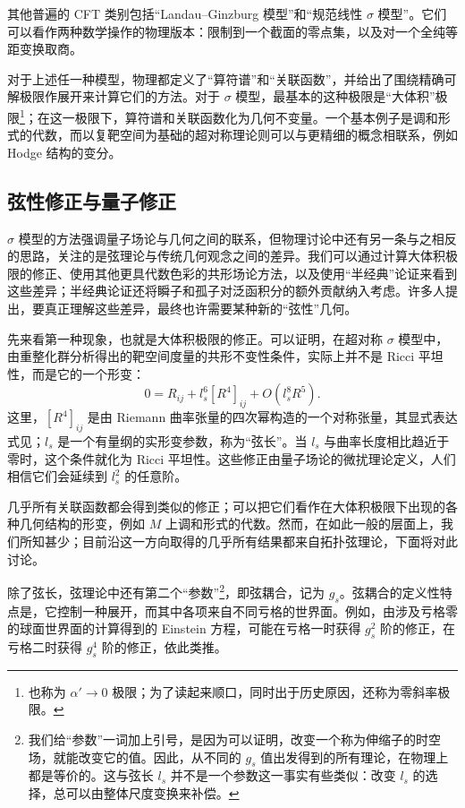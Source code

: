 其他普遍的 CFT 类别包括“Landau--Ginzburg 模型”和“规范线性 $\sigma$ 模型”。它们可以看作两种数学操作的物理版本：限制到一个截面的零点集，以及对一个全纯等距变换取商。

对于上述任一种模型，物理都定义了“算符谱”和“关联函数”，并给出了围绕精确可解极限作展开来计算它们的方法。对于 $\sigma$ 模型，最基本的这种极限是“大体积”极限\footnote{也称为 $\alpha'\to0$ 极限；为了读起来顺口，同时出于历史原因，还称为零斜率极限。}；在这一极限下，算符谱和关联函数化为几何不变量。一个基本例子是调和形式的代数，而以复靶空间为基础的超对称理论则可以与更精细的概念相联系，例如 Hodge 结构的变分。

\subsection{弦性修正与量子修正}\label{sec:1.1.1}

$\sigma$ 模型的方法强调量子场论与几何之间的联系，但物理讨论中还有另一条与之相反的思路，关注的是弦理论与传统几何观念之间的差异。我们可以通过计算大体积极限的修正、使用其他更具代数色彩的共形场论方法，以及使用“半经典”论证来看到这些差异；半经典论证还将瞬子和孤子对泛函积分的额外贡献纳入考虑。许多人提出，要真正理解这些差异，最终也许需要某种新的“弦性”几何。

先来看第一种现象，也就是大体积极限的修正。可以证明，在超对称 $\sigma$ 模型中，由重整化群分析得出的靶空间度量的共形不变性条件，实际上并不是 Ricci 平坦性，而是它的一个形变：
\begin{equation}\label{eq:1.1}
0=R_{ij}+l_s^6[R^4]_{ij}+O(l_s^8R^5).
\end{equation}
这里，$[R^4]_{ij}$ 是由 Riemann 曲率张量的四次幂构造的一个对称张量，其显式表达式见；$l_s$ 是一个有量纲的实形变参数，称为“弦长”。当 $l_s$ 与曲率长度相比趋近于零时，这个条件就化为 Ricci 平坦性。这些修正由量子场论的微扰理论定义，人们相信它们会延续到 $l_s^2$ 的任意阶。

几乎所有关联函数都会得到类似的修正；可以把它们看作在大体积极限下出现的各种几何结构的形变，例如 $M$ 上调和形式的代数。然而，在如此一般的层面上，我们所知甚少；目前沿这一方向取得的几乎所有结果都来自拓扑弦理论，下面将对此讨论。

除了弦长，弦理论中还有第二个“参数”\footnote{我们给“参数”一词加上引号，是因为可以证明，改变一个称为伸缩子的时空场，就能改变它的值。因此，从不同的 $g_s$ 值出发得到的所有理论，在物理上都是等价的。这与弦长 $l_s$ 并不是一个参数这一事实有些类似：改变 $l_s$ 的选择，总可以由整体尺度变换来补偿。}，即弦耦合，记为 $g_s$。弦耦合的定义性特点是，它控制一种展开，而其中各项来自不同亏格的世界面。例如，由涉及亏格零的球面世界面的计算得到的 Einstein 方程，可能在亏格一时获得 $g_s^2$ 阶的修正，在亏格二时获得 $g_s^4$ 阶的修正，依此类推。

